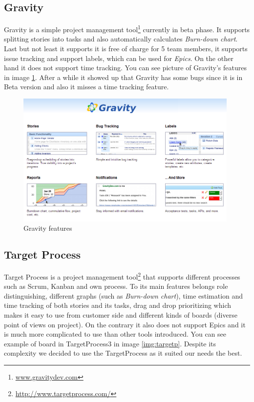 
\subsection{Gravity} 
Gravity is a simple project management tool\footnote{\url{www.gravitydev.com}} currently in beta phase.
It supports splitting stories into tasks and also automatically calculates \emph{Burn-down chart}. 
Last but not least it supports it is free of charge for 5 team members, it supports issue tracking and support labels, which can be used for \emph{Epics}.
On the other hand it does not support time tracking.
You can see picture of Gravity's features in image \ref{img:gravity}. After a while it showed up that Gravity has some bugs since it is in Beta version and also it misses a time tracking feature.

\begin{figure}[!h]
	\centering
		\includegraphics[width=11cm]{preliminaryStudies/gravity.png}
	\caption{Gravity features}
	\label{img:gravity}
\end{figure}

\subsection{Target Process} 
Target Process is a project management tool\footnote{\url{http://www.targetprocess.com/}} that supports different processes such as Scrum, Kanban and own process. 
To its main features belongs role distinguishing, different graphs (such as \emph{Burn-down chart}), time estimation and time tracking of both stories and its tasks, drag and drop prioritizing which makes it easy to use from customer side and different kinds of boards (diverse point of views on project).
On the contrary it also does not support Epics and it is much more complicated to use than other tools introduced.
You can see example of board in TargetProcess3 in image \ref{img:targetp}. Despite its complexity we decided to use the TargetProcess as it suited our needs the best.

